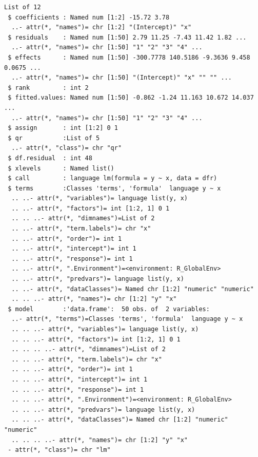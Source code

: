 \documentclass[
  letterpaper,
  DIV=11,
  numbers=noendperiod]{scrreprt}
\begin{document}
\begin{verbatim}
List of 12
 $ coefficients : Named num [1:2] -15.72 3.78
  ..- attr(*, "names")= chr [1:2] "(Intercept)" "x"
 $ residuals    : Named num [1:50] 2.79 11.25 -7.43 11.42 1.82 ...
  ..- attr(*, "names")= chr [1:50] "1" "2" "3" "4" ...
 $ effects      : Named num [1:50] -300.7778 140.5186 -9.3636 9.458 0.0675 ...
  ..- attr(*, "names")= chr [1:50] "(Intercept)" "x" "" "" ...
 $ rank         : int 2
 $ fitted.values: Named num [1:50] -0.862 -1.24 11.163 10.672 14.037 ...
  ..- attr(*, "names")= chr [1:50] "1" "2" "3" "4" ...
 $ assign       : int [1:2] 0 1
 $ qr           :List of 5
  ..- attr(*, "class")= chr "qr"
 $ df.residual  : int 48
 $ xlevels      : Named list()
 $ call         : language lm(formula = y ~ x, data = dfr)
 $ terms        :Classes 'terms', 'formula'  language y ~ x
  .. ..- attr(*, "variables")= language list(y, x)
  .. ..- attr(*, "factors")= int [1:2, 1] 0 1
  .. .. ..- attr(*, "dimnames")=List of 2
  .. ..- attr(*, "term.labels")= chr "x"
  .. ..- attr(*, "order")= int 1
  .. ..- attr(*, "intercept")= int 1
  .. ..- attr(*, "response")= int 1
  .. ..- attr(*, ".Environment")=<environment: R_GlobalEnv> 
  .. ..- attr(*, "predvars")= language list(y, x)
  .. ..- attr(*, "dataClasses")= Named chr [1:2] "numeric" "numeric"
  .. .. ..- attr(*, "names")= chr [1:2] "y" "x"
 $ model        :'data.frame':  50 obs. of  2 variables:
  ..- attr(*, "terms")=Classes 'terms', 'formula'  language y ~ x
  .. .. ..- attr(*, "variables")= language list(y, x)
  .. .. ..- attr(*, "factors")= int [1:2, 1] 0 1
  .. .. .. ..- attr(*, "dimnames")=List of 2
  .. .. ..- attr(*, "term.labels")= chr "x"
  .. .. ..- attr(*, "order")= int 1
  .. .. ..- attr(*, "intercept")= int 1
  .. .. ..- attr(*, "response")= int 1
  .. .. ..- attr(*, ".Environment")=<environment: R_GlobalEnv> 
  .. .. ..- attr(*, "predvars")= language list(y, x)
  .. .. ..- attr(*, "dataClasses")= Named chr [1:2] "numeric" "numeric"
  .. .. .. ..- attr(*, "names")= chr [1:2] "y" "x"
 - attr(*, "class")= chr "lm"
\end{verbatim}
\end{document}
